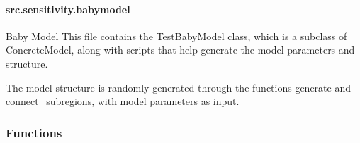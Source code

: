 \documentclass[letterpaper,10pt,english]{sphinxmanual}
\begin{document}
\sphinxstepscope


\paragraph{src.sensitivity.babymodel}
\label{\detokenize{src.sensitivity.babymodel:module-src.sensitivity.babymodel}}\label{\detokenize{src.sensitivity.babymodel:src-sensitivity-babymodel}}\label{\detokenize{src.sensitivity.babymodel::doc}}
\sphinxAtStartPar
Baby Model
This file contains the TestBabyModel class, which is a subclass of ConcreteModel, along with scripts that
help generate the model parameters and structure.

\sphinxAtStartPar
The model structure is randomly generated through the functions generate and connect\_subregions, with
model parameters as input.
\subsubsection*{Functions}
\end{document}
